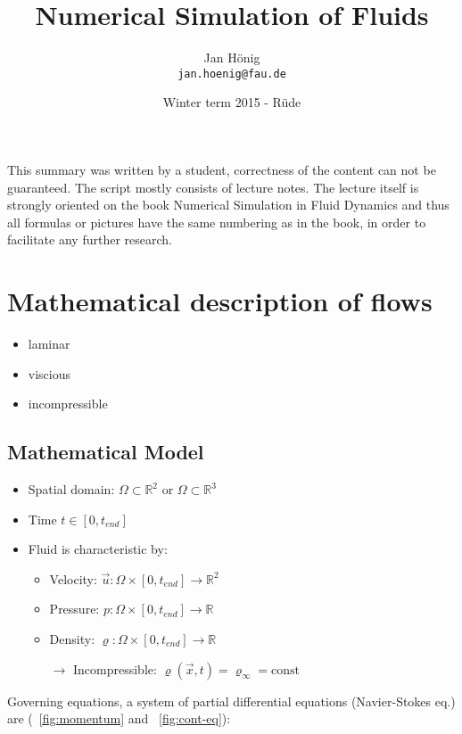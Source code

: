 \documentclass[a4paper,11pt]{scrartcl}
\title{Numerical Simulation of Fluids}
\author{Jan H\"onig \\ \texttt{jan.hoenig@fau.de}}
\date{Winter term 2015 - R\"ude}
\begin{document}
\maketitle

\vfill

This summary was written by a student, correctness of the content can not be guaranteed. The script mostly consists of lecture notes. The lecture itself is strongly oriented on the book Numerical Simulation in Fluid Dynamics and thus all formulas or pictures have the same numbering as in the book, in order to facilitate any further research.


\newpage
\tableofcontents
\newpage





\section{Mathematical description of flows}
\begin{itemize}
	\item laminar
	\item viscious
	\item incompressible
\end{itemize}
\subsection{Mathematical Model}
\begin{itemize}
	\item Spatial domain: $\Omega \subset  \mathds{R}^2$ or $\Omega \subset  \mathds{R}^3$
	\item Time $t \in [0, t_{end}]$
	\item Fluid is characteristic by:
	\begin{itemize}
		\item Velocity: $\vec{u} : \Omega \times [0, t_{end}] \rightarrow \mathds{R}^2$
		\item Pressure: $p : \Omega \times [0, t_{end}] \rightarrow \mathds{R}$
		\item Density: $ \varrho : \Omega \times [0, t_{end}] \rightarrow \mathds{R}$
		\item[$\rightarrow$] Incompressible: $\varrho(\vec{x},t) = \varrho_\infty = \text{const}$
	\end{itemize}
\end{itemize}
Governing equations, a system of partial differential equations (Navier-Stokes eq.) are (~\ref{fig:momentum} and ~\ref{fig:cont-eq}):
\end{document}
